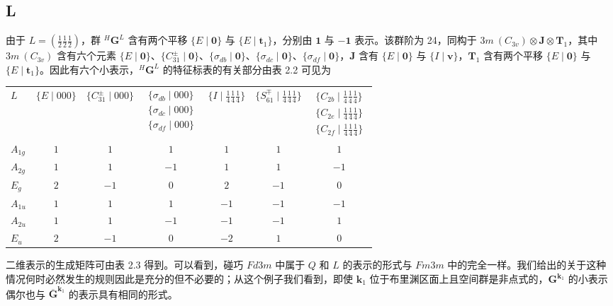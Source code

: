 \subsection*{L}

由于 $L = (\frac{1}{2}\frac{1}{2}\frac{1}{2})$，群 ${}^{H}\mathbf{G}^{L}$ 含有两个平移 $\{E \mid \mathbf{0}\}$ 与 $\{E \mid \mathbf{t}_{1}\}$，分别由 $\mathbf{1}$ 与 $-\mathbf{1}$ 表示。该群阶为 24，同构于 $3m\ (C_{3v}) \otimes \mathbf{J} \otimes \mathbf{T}_{1}$，其中 $3m\ (C_{3v})$ 含有六个元素 $\{E \mid \mathbf{0}\}$、$\{C^{\pm}_{31} \mid \mathbf{0}\}$、$\{\sigma_{db} \mid \mathbf{0}\}$、$\{\sigma_{dc} \mid \mathbf{0}\}$、$\{\sigma_{df} \mid \mathbf{0}\}$，$\mathbf{J}$ 含有 $\{E \mid \mathbf{0}\}$ 与 $\{I \mid \mathbf{v}\}$，$\mathbf{T}_{1}$ 含有两个平移 $\{E \mid \mathbf{0}\}$ 与 $\{E \mid \mathbf{t}_{1}\}$。因此有六个小表示，${}^{H}\mathbf{G}^{L}$ 的特征标表的有关部分由表 2.2 可见为
\begin{center}
\begin{tabular}{lcccccc}
$L$ & $\{E \mid 000\}$ & $\{C^{\pm}_{31} \mid 000\}$ & $\begin{array}{c}\{\sigma_{db} \mid 000\}\\ \{\sigma_{dc} \mid 000\}\\ \{\sigma_{df} \mid 000\}\end{array}$ & $\{I \mid {\frac{1}{4}}{\frac{1}{4}}{\frac{1}{4}}\}$ & $\{S^{\mp}_{61} \mid {\frac{1}{4}}{\frac{1}{4}}{\frac{1}{4}}\}$ & $\begin{array}{c}\{C_{2b} \mid {\frac{1}{4}}{\frac{1}{4}}{\frac{1}{4}}\}\\ \{C_{2e} \mid {\frac{1}{4}}{\frac{1}{4}}{\frac{1}{4}}\}\\ \{C_{2f} \mid {\frac{1}{4}}{\frac{1}{4}}{\frac{1}{4}}\}\end{array}$\\
$A_{1g}$ & $1$ & $1$ & $1$ & $1$ & $1$ & $1$\\
$A_{2g}$ & $1$ & $1$ & $-1$ & $1$ & $1$ & $-1$\\
$E_{g}$ & $2$ & $-1$ & $0$ & $2$ & $-1$ & $0$\\
$A_{1u}$ & $1$ & $1$ & $1$ & $-1$ & $-1$ & $-1$\\
$A_{2u}$ & $1$ & $1$ & $-1$ & $-1$ & $-1$ & $1$\\
$E_{u}$ & $2$ & $-1$ & $0$ & $-2$ & $1$ & $0$
\end{tabular}
\end{center}
二维表示的生成矩阵可由表 2.3 得到。可以看到，碰巧 $Fd3m$ 中属于 $Q$ 和 $L$ 的表示的形式与 $Fm3m$ 中的完全一样。我们给出的关于这种情况何时必然发生的规则因此是充分的但不必要的；从这个例子我们看到，即使 $\mathbf{k}_{1}$ 位于布里渊区面上且空间群是非点式的，$\mathbf{G}^{\mathbf{k}_{1}}$ 的小表示偶尔也与 $\overline{\mathbf{G}}^{\mathbf{k}_{1}}$ 的表示具有相同的形式。
